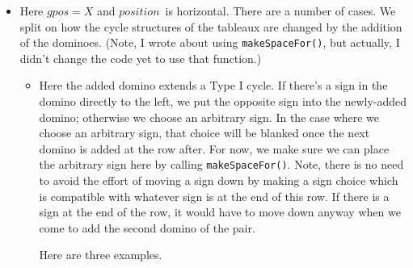 \documentclass[12pt]{article}
\numberwithin{equation}{section}
\newcommand{\horizontalDominoRS}[3]{\filldraw [dominoRSStyle] (#2 - 1 + \eps, #1 - 1 + \eps) rectangle + (2 - \teps, 1 -\teps) node [dominoText] {$#3$};}
\newcommand{\pos}{$position$}
\begin{document}
\begin{itemize}
    \item Here $gpos = X$ and \pos\ is horizontal.
    There are a number of cases.
    We split on how the cycle structures of the tableaux are changed by the addition of the dominoes.
    (Note, I wrote about using \texttt{makeSpaceFor()}, but actually, I didn't change the code yet to use that function.)
    \begin{itemize}
      \item Here the added domino extends a Type I cycle.
      If there's a sign in the domino directly to the left, we put the opposite sign into the newly-added domino; otherwise we choose an arbitrary sign.
      In the case where we choose an arbitrary sign, that choice will be blanked once the next domino is added at the row after.
      For now, we make sure we can place the arbitrary sign here by calling \texttt{makeSpaceFor()}.
      Note, there is no need to avoid the effort of moving a sign down by making a sign choice which is compatible with whatever sign is at the end of this row.
      If there is a sign at the end of the row, it would have to move down anyway when we come to add the second domino of the pair.

      Here are three examples.
      \begin{figure}[H]
        \centering
\end{figure}
\end{itemize}
\end{itemize}
\end{document}

